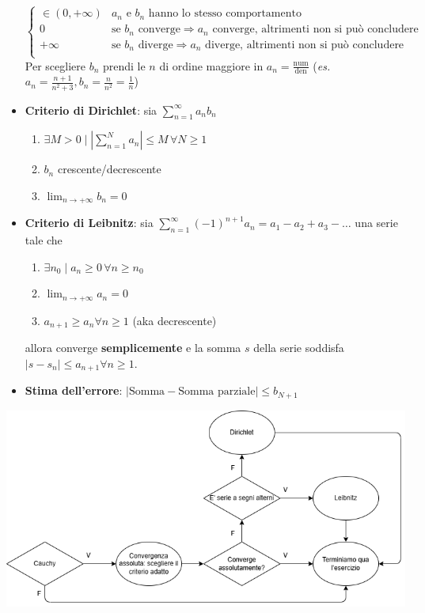 \documentclass[10pt, a4paper]{article}
\begin{document}
\begin{itemize}
\begin{equation*}
\begin{cases}
                    \in (0,+\infty) & a_n \text{ e } b_n \text{ hanno lo stesso comportamento}\\
                    0 & \text{se } b_n \text{ converge} \Rightarrow a_n \text{ converge, altrimenti non si può concludere}\\
                    +\infty & \text{se } b_n \text{ diverge} \Rightarrow a_n \text{ diverge, altrimenti non si può concludere}\\
                \end{cases}
            \end{equation*}
            Per scegliere $b_n$ prendi le $n$ di ordine maggiore in $a_n=\frac{\text{num}}{\text{den}}$ (\textit{es.} $a_n=\frac{n+1}{n^2+3}, b_n=\frac{n}{n^2}=\frac{1}{n}$)
            \item \textbf{Criterio di Dirichlet}: sia $\sum_{n=1}^{\infty}a_nb_n$ \begin{enumerate}
                \item $\exists M>0\mid \left|\sum_{n=1}^{N}a_n\right|\leq M\,\forall N\geq 1$
                \item $b_n$ crescente/decrescente
                \item $\lim_{n\rightarrow+\infty}b_n=0$
            \end{enumerate}
            \item \textbf{Criterio di Leibnitz}: sia $\sum_{n=1}^{\infty}(-1)^{n+1}a_n = a_1-a_2+a_3-\ldots$ una serie tale che
                \begin{enumerate}
                    \item $\exists n_0\mid a_n\geq 0\,\forall n\geq n_0$
                    \item $\lim_{n\rightarrow+\infty}a_n=0$
                    \item $a_{n+1}\geq a_n \forall n\geq 1$ (aka decrescente)
                \end{enumerate}
                allora converge \textbf{semplicemente} e la somma $s$ della serie soddisfa $\left|s-s_n\right|\leq a_{n+1}\forall n\geq 1$.
            \item \textbf{Stima dell'errore}: $\left|\text{Somma} - \text{Somma parziale}\right|\leq b_{N+1}$
        \end{itemize}
        \begin{center}
            \includegraphics[width=.8\textwidth]{Images/convergenzaflowchart.png}
        \end{center}
    \newpage
\end{document}
